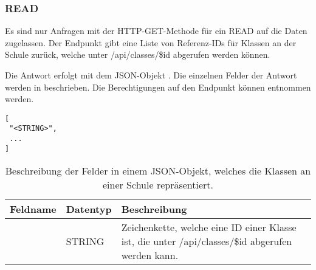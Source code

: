 \subsubsection{READ}
\label{sec:rest:api:schools:classes:read}
Es sind nur Anfragen mit der HTTP-GET-Methode für ein READ auf die Daten zugelassen.
Der Endpunkt gibt eine Liste von Referenz-IDs für Klassen an der Schule zurück, welche unter /api/classes/\$id abgerufen werden können.

Die Antwort erfolgt mit dem JSON-Objekt . 
Die einzelnen Felder der Antwort werden in  beschrieben.
Die Berechtigungen auf den Endpunkt können  entnommen werden.


\begin{lstlisting}[caption={JSON-Antwort für einen GET-Aufruf des Pfads /api/schools/\$id/classes},label={lst:code:rest:api:schools:classes:read:ret},frame=tlrb]
[
 "<STRING>",
 ...
]
\end{lstlisting}
\begin{longtable}{|p{}|p{}|p{}|}
		\caption{Beschreibung der Felder in einem JSON-Objekt, welches die Klassen an einer Schule repräsentiert.}
\endfoot
		\caption{Beschreibung der Felder in einem JSON-Objekt, welches die Klassen an einer Schule repräsentiert.}
		\label{tab:rest:api:schools:classes:read:ret:json}
\endlastfoot 
\hline
			\textbf{Feldname} & \textbf{Datentyp} & \textbf{Beschreibung} \\ \hline
\endhead
 & STRING & Zeichenkette, welche eine ID einer Klasse ist, die unter /api/classes/\$id abgerufen werden kann. \\ \hline
\end{longtable}